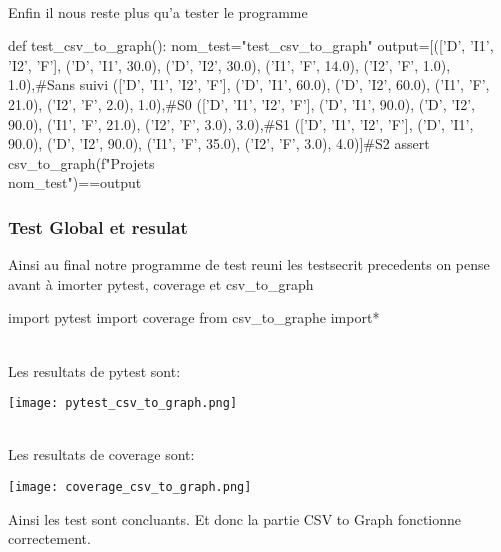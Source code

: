 \documentclass{article}
\begin{document}
\\
Enfin il nous reste plus qu'a tester le programme
\\
\begin{python}
def test_csv_to_graph():
    nom_test="test_csv_to_graph"
    output=[(['D', 'I1', 'I2', 'F'], {('D', 'I1', 30.0), ('D', 'I2', 30.0), ('I1', 'F', 14.0), ('I2', 'F', 1.0)}, 1.0),#Sans suivi
(['D', 'I1', 'I2', 'F'], {('D', 'I1', 60.0), ('D', 'I2', 60.0), ('I1', 'F', 21.0), ('I2', 'F', 2.0)}, 1.0),#S0
(['D', 'I1', 'I2', 'F'], {('D', 'I1', 90.0), ('D', 'I2', 90.0), ('I1', 'F', 21.0), ('I2', 'F', 3.0)}, 3.0),#S1
(['D', 'I1', 'I2', 'F'], {('D', 'I1', 90.0), ('D', 'I2', 90.0), ('I1', 'F', 35.0), ('I2', 'F', 3.0)}, 4.0)]#S2
    assert csv_to_graph(f"Projets\\{nom_test}")==output
\end{python}

\subsubsection{Test Global et resulat}
Ainsi au final notre programme de test reuni les testsecrit precedents on pense avant à imorter pytest, coverage et csv\_to\_graph
\\
\begin{python}
import pytest
import coverage
from csv_to_graphe import*
\end{python}
\\
Les resultats de pytest sont:
\\
\begin{center}
\texttt{[image: pytest\_csv\_to\_graph.png]}
\end{center}


\\
Les resultats de coverage sont:
\\
\begin{center}
\texttt{[image: coverage\_csv\_to\_graph.png]}
\end{center}

Ainsi les test sont concluants. Et donc la partie CSV to Graph fonctionne correctement.
\end{document}
